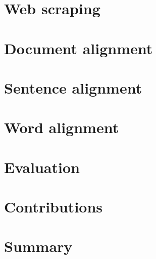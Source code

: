 




\tableofcontents


\chapter{Web scraping}
\chapter{Document alignment}
\chapter{Sentence alignment}
\chapter{Word alignment}

\chapter{Evaluation}
\chapter{Contributions}
\chapter{Summary}

%
\printbibliography
